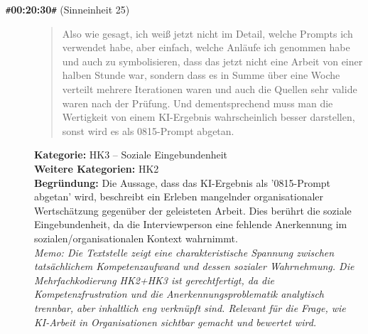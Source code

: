 \begin{description}
  \item[\texttt{\#}\textbf{00:20:30}\texttt{\#} (Sinneinheit 25)]
  \begin{quote}
  Also wie gesagt, ich weiß jetzt nicht im Detail, welche Prompts ich verwendet habe, aber einfach, welche Anläufe ich genommen habe und auch zu symbolisieren, dass das jetzt nicht eine Arbeit von einer halben Stunde war, sondern dass es in Summe über eine Woche verteilt mehrere Iterationen waren und auch die Quellen sehr valide waren nach der Prüfung. Und dementsprechend muss man die Wertigkeit von einem KI-Ergebnis wahrscheinlich besser darstellen, sonst wird es als 0815-Prompt abgetan.
  \end{quote}
  \textbf{Kategorie:} HK3 -- Soziale Eingebundenheit\\
  \textbf{Weitere Kategorien:} HK2\\
  \textbf{Begr\"undung:} Die Aussage, dass das KI-Ergebnis als '0815-Prompt abgetan' wird, beschreibt ein Erleben mangelnder organisationaler Wertschätzung gegenüber der geleisteten Arbeit. Dies berührt die soziale Eingebundenheit, da die Interviewperson eine fehlende Anerkennung im sozialen/organisationalen Kontext wahrnimmt.
  \\\textit{Memo: Die Textstelle zeigt eine charakteristische Spannung zwischen tatsächlichem Kompetenzaufwand und dessen sozialer Wahrnehmung. Die Mehrfachkodierung HK2+HK3 ist gerechtfertigt, da die Kompetenzfrustration und die Anerkennungsproblematik analytisch trennbar, aber inhaltlich eng verknüpft sind. Relevant für die Frage, wie KI-Arbeit in Organisationen sichtbar gemacht und bewertet wird.}
\end{description}
\medskip

